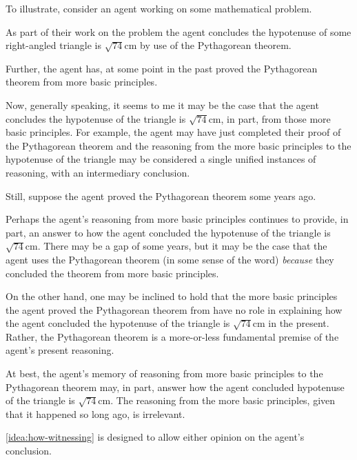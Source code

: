 \begin{note}[Illustration]
  To illustrate, consider an agent working on some mathematical problem.

  As part of their work on the problem the agent concludes the hypotenuse of some right-angled triangle is \(\sqrt{74}\text{cm}\) by use of the Pythagorean theorem.

  Further, the agent has, at some point in the past proved the Pythagorean theorem from more basic principles.

  Now, generally speaking, it seems to me it may be the case that the agent concludes the hypotenuse of the triangle is \(\sqrt{74}\text{cm}\), in part, from those more basic principles.
  For example, the agent may have just completed their proof of the Pythagorean theorem and the reasoning from the more basic principles to the hypotenuse of the triangle may be considered a single unified instances of reasoning, with an intermediary conclusion.

  Still, suppose the agent proved the Pythagorean theorem some years ago.

  Perhaps the agent's reasoning from more basic principles continues to provide, in part, an answer to how the agent concluded the hypotenuse of the triangle is \(\sqrt{74}\text{cm}\).
  There may be a gap of some years, but it may be the case that the agent uses the Pythagorean theorem (in some sense of the word) \emph{because} they concluded the theorem from more basic principles.

  On the other hand, one may be inclined to hold that the more basic principles the agent proved the Pythagorean theorem from have no role in explaining how the agent concluded the hypotenuse of the triangle is \(\sqrt{74}\text{cm}\) in the present.
  Rather, the Pythagorean theorem is a more-or-less fundamental premise of the agent's present reasoning.

  At best, the agent's memory of reasoning from more basic principles to the Pythagorean theorem may, in part, answer how the agent concluded hypotenuse of the triangle is \(\sqrt{74}\text{cm}\).
  The reasoning from the more basic principles, given that it happened so long ago, is irrelevant.

  \autoref{idea:how-witnessing} is designed to allow either opinion on the agent's conclusion.
\end{note}

